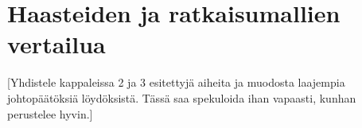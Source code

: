 \chapter{Haasteiden ja ratkaisumallien vertailua}

[Yhdistele kappaleissa 2 ja 3 esitettyjä aiheita ja muodosta laajempia johtopäätöksiä löydöksistä. Tässä saa spekuloida ihan vapaasti, kunhan perustelee hyvin.]

